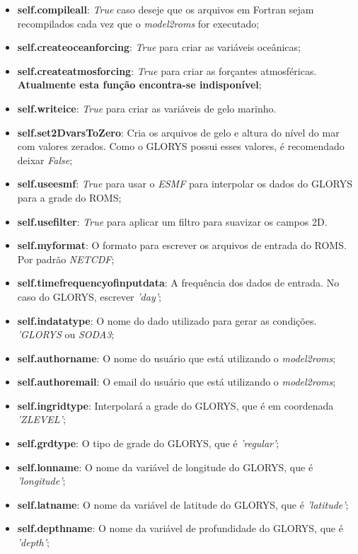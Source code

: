 \begin{itemize}
    \item \textbf{self.compileall}: \textit{True} caso deseje que os arquivos em Fortran sejam recompilados cada vez que o \textit{model2roms} for executado;
    \item \textbf{self.createoceanforcing}: \textit{True} para criar as variáveis oceânicas;
    \item \textbf{self.createatmosforcing}: \textit{True} para criar as forçantes atmosféricas. \textbf{Atualmente esta função encontra-se indisponível};
    \item \textbf{self.writeice}: \textit{True} para criar as variáveis de gelo marinho.
    \item \textbf{self.set2DvarsToZero}: Cria os arquivos de gelo e altura do nível do mar com valores zerados. Como o GLORYS possui esses valores, é recomendado deixar \textit{False};
    \item \textbf{self.useesmf}: \textit{True} para usar o \textit{ESMF} para interpolar os dados do GLORYS para a grade do ROMS;
    \item \textbf{self.usefilter}: \textit{True} para aplicar um filtro para suavizar os campos 2D.
    \item \textbf{self.myformat}: O formato para escrever os arquivos de entrada do ROMS. Por padrão \textit{NETCDF};
    \item \textbf{self.timefrequencyofinputdata}: A frequência dos dados de entrada. No caso do GLORYS, escrever \textit{'day'};
    \item \textbf{self.indatatype}: O nome do dado utilizado para gerar as condições. \textit{'GLORYS} ou \textit{SODA3};
    \item \textbf{self.authorname}: O nome do usuário que está utilizando o \textit{model2roms};
    \item \textbf{self.authoremail}: O email do usuário que está utilizando o \textit{model2roms};
    \item \textbf{self.ingridtype}: Interpolará a grade do GLORYS, que é em coordenada \textit{'ZLEVEL'};
    \item \textbf{self.grdtype}: O tipo de grade do GLORYS, que é \textit{'regular'};
    \item \textbf{self.lonname}: O nome da variável de longitude do GLORYS, que é \textit{'longitude'};
    \item \textbf{self.latname}: O nome da variável de latitude do GLORYS, que é \textit{'latitude'};
    \item \textbf{self.depthname}: O nome da variável de profundidade do GLORYS, que é \textit{'depth'};

\end{itemize}
